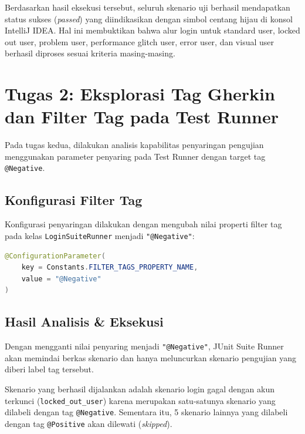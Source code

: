 \documentclass[a4paper,oneside,11pt]{book}
\begin{document}

Berdasarkan hasil eksekusi tersebut, seluruh skenario uji berhasil mendapatkan status sukses (\textit{passed}) yang diindikasikan dengan simbol centang hijau di konsol IntelliJ IDEA. Hal ini membuktikan bahwa alur login untuk standard user, locked out user, problem user, performance glitch user, error user, dan visual user berhasil diproses sesuai kriteria masing-masing.

\section{Tugas 2: Eksplorasi Tag Gherkin dan Filter Tag pada Test Runner}
Pada tugas kedua, dilakukan analisis kapabilitas penyaringan pengujian menggunakan parameter penyaring pada Test Runner dengan target tag \texttt{@Negative}.

\subsection{Konfigurasi Filter Tag}
Konfigurasi penyaringan dilakukan dengan mengubah nilai properti filter tag pada kelas \texttt{LoginSuiteRunner} menjadi \texttt{"@Negative"}:

\begin{lstlisting}[language=Java, caption=Potongan Konfigurasi Filter Tag @Negative]
@ConfigurationParameter(
    key = Constants.FILTER_TAGS_PROPERTY_NAME, 
    value = "@Negative"
)
\end{lstlisting}

\subsection{Hasil Analisis \& Eksekusi}
Dengan mengganti nilai penyaring menjadi \texttt{"@Negative"}, JUnit Suite Runner akan memindai berkas skenario dan hanya meluncurkan skenario pengujian yang diberi label tag tersebut. 

Skenario yang berhasil dijalankan adalah skenario login gagal dengan akun terkunci (\texttt{locked\_out\_user}) karena merupakan satu-satunya skenario yang dilabeli dengan tag \texttt{@Negative}. Sementara itu, 5 skenario lainnya yang dilabeli dengan tag \texttt{@Positive} akan dilewati (\textit{skipped}).
\end{document}
